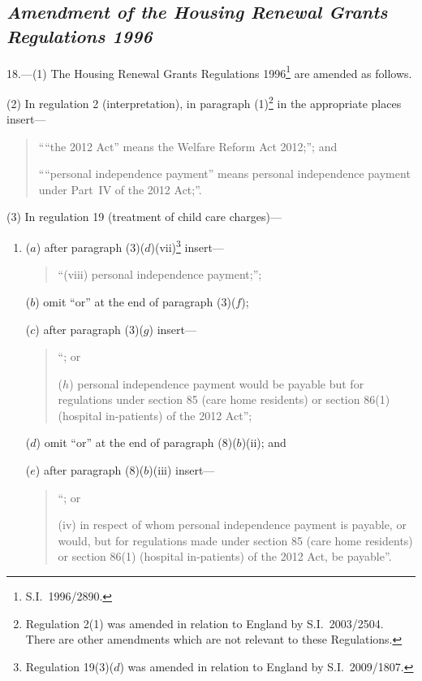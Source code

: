 \documentclass[12pt,a4paper]{article}
\begin{document}
\subsection*{\itshape Amendment of the Housing Renewal Grants Regulations 1996}

18.—(1) The Housing Renewal Grants Regulations 1996\footnote{S.I.~1996/2890.} are amended as follows.

(2) In regulation 2 (interpretation), in paragraph (1)\footnote{Regulation 2(1) was amended in relation to England by S.I.~2003\slash 2504. There are other amendments which are not relevant to these Regulations.} in the appropriate places insert—
\begin{quotation}
““the 2012 Act” means the Welfare Reform Act 2012;”; and

““personal independence payment” means personal independence payment under Part~IV of the 2012 Act;”.
\end{quotation}

(3) In regulation 19 (treatment of child care charges)—
\begin{enumerate}\item[]
($a$) after paragraph (3)($d$)(vii)\footnote{Regulation 19(3)($d$)  was amended in relation to England by S.I.~2009/1807.} insert—
\begin{quotation}
“(viii) personal independence payment;”;
\end{quotation}

($b$) omit “or” at the end of paragraph (3)($f$);

($c$) after paragraph (3)($g$)  insert—
\begin{quotation}
“; or

($h$) personal independence payment would be payable but for regulations under section 85 (care home residents) or section 86(1) (hospital in-patients) of the 2012 Act”;
\end{quotation}

($d$) omit “or” at the end of paragraph (8)($b$)(ii); and

($e$) after paragraph (8)($b$)(iii)  insert—
\begin{quotation}
“; or

(iv) in respect of whom personal independence payment is payable, or would, but for regulations made under section 85 (care home residents) or section 86(1) (hospital in-patients) of the 2012 Act, be payable”.
\end{quotation}
\end{enumerate}
\end{document}
